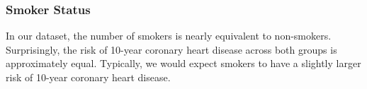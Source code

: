 \documentclass[10pt]{article}
\begin{document}
\begin{figure}[hbt!]
\hspace*{\fill}
\centering
{}\hspace{2em}%
%
\hspace*{\fill}
\end{figure}



\subsubsection*{Smoker Status}

In our dataset, the number of smokers is nearly equivalent to non-smokers. Surprisingly, the risk of 10-year coronary heart disease across both groups is approximately equal. Typically, we would expect smokers to have a slightly larger risk of 10-year coronary heart disease.
\end{document}
